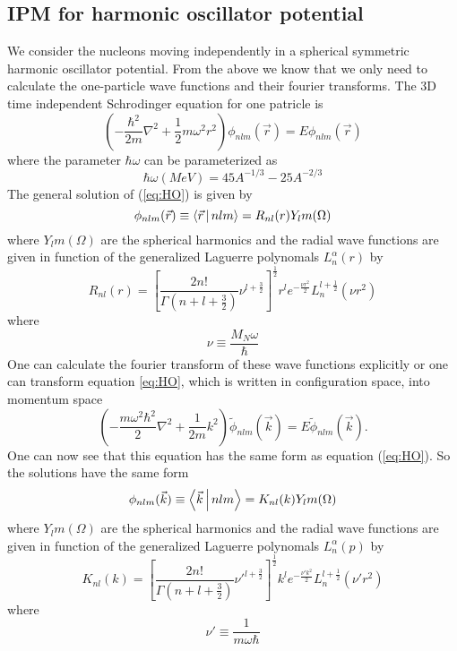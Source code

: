 \documentclass[12pt]{article}
\begin{document}
\subsection{IPM for harmonic oscillator potential}
We consider the nucleons moving independently in a spherical symmetric harmonic oscillator potential. From the above we know that we only need to calculate the one-particle wave functions and their fourier transforms. The 3D time independent Schrodinger equation for one patricle is
\begin{equation} \label{eq:HO}
\left( -\frac{\hbar^2}{2m} \nabla^2 + \frac{1}{2} m \omega^2 r^2 \right) \phi_{nlm}(\vec{r}) = E\phi_{nlm}(\vec{r})
\end{equation}
where the parameter $\hbar\omega$ can be parameterized as
\begin{equation}
\hbar\omega (MeV) = 45A^{-1/3}-25A^{-2/3}
\end{equation}
The general solution of (\ref{eq:HO}) is given by
\begin{equation}
\phi_{nlm}(\vec{r}) \equiv \Braket{\vec{r}|nlm} = R_{nl}(r)Y_lm(\Omega)	
\end{equation}
where $Y_lm(\Omega)$ are the spherical harmonics and the radial wave functions are given in function of the generalized Laguerre polynomals $L^\alpha_n(r)$ by
\begin{equation}
 R_{nl}(r) = \left[ \frac{2n!}{\Gamma(n+l+\frac{3}{2})}\nu^{l+\frac{3}{2}} \right]^{\frac{1}{2}} r^l e^{-\frac{\nu r^2}{2}} L^{l+\frac{1}{2}}_n(\nu r^2)
\end{equation}
where 
\begin{equation}
\nu \equiv \frac{M_N \omega}{\hbar}
\end{equation}
One can calculate the fourier transform of these wave functions explicitly or one can transform equation \ref{eq:HO}, which is written in configuration space, into momentum space
\begin{equation} \label{eq:HO_momentum}
\left( -\frac{m \omega^2 \hbar^2}{2} \nabla^2 + \frac{1}{2m} k^2 \right) \tilde{\phi}_{nlm}(\vec{k}) = E\tilde{\phi}_{nlm}(\vec{k}).
\end{equation}
One can now see that this equation has the same form as equation (\ref{eq:HO}). So the solutions have the same form
\begin{equation}
\phi_{nlm}(\vec{k}) \equiv \Braket{\vec{k}|nlm} = K_{nl}(k)Y_lm(\Omega)	
\end{equation}
where $Y_lm(\Omega)$ are the spherical harmonics and the radial wave functions are given in function of the generalized Laguerre polynomals $L^\alpha_n(p)$ by
\begin{equation}
 K_{nl}(k) = \left[ \frac{2n!}{\Gamma(n+l+\frac{3}{2})}\nu'^{l+\frac{3}{2}} \right]^{\frac{1}{2}} k^l e^{-\frac{\nu' k^2}{2}} L^{l+\frac{1}{2}}_n(\nu' r^2)
\end{equation}
where 
\begin{equation}
\nu' \equiv \frac{1}{m \omega \hbar}
\end{equation}
\end{document}
